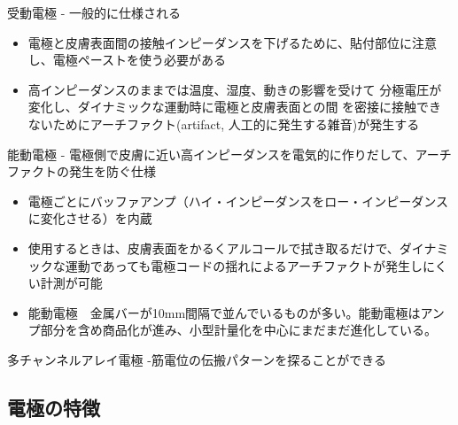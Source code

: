 \documentclass[10pt,twocolumn]{jarticle}
\begin{document}
\begin{itemize}
{\footnotesize
\item 受動電極 - 一般的に仕様される

	\begin{itemize}
	\item 電極と皮膚表面間の接触インピーダンスを下げるために、貼付部位に注意し、電極ペーストを使う必要がある
	\item 高インピーダンスのままでは温度、湿度、動きの影響を受けて
          分極電圧が変化し、ダイナミックな運動時に電極と皮膚表面との間
          を密接に接触できないためにアーチファクト(artifact, 人工的に発生する雑音)が発生する
	\end{itemize}
}
\item *能動電極 - 電極側で皮膚に近い高インピーダンスを電気的に作りだして、アーチファクトの発生を防ぐ仕様
	
	\begin{itemize}
	\item 電極ごとにバッファアンプ（ハイ・インピーダンスをロー・インピーダンスに変化させる）を内蔵
	\item 使用するときは、皮膚表面をかるくアルコールで拭き取るだけで、ダイナミックな運動であっても電極コードの揺れによるアーチファクトが発生しにくい計測が可能
	\item  能動電極　金属バーが10mm間隔で並んでいるものが多い。能動電極はアンプ部分を含め商品化が進み、小型計量化を中心にまだまだ進化している。
	\end{itemize}

\item 多チャンネルアレイ電極 -筋電位の伝搬パターンを探ることができる
\end{itemize}

\subsection{電極の特徴}
\end{document}
